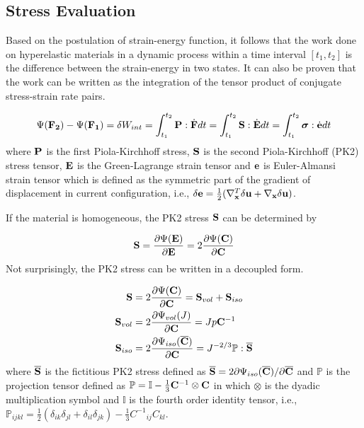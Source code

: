 %
\subsection{Stress Evaluation} \label{general_stress}
Based on the postulation of strain-energy function, it follows that the work done on hyperelastic materials in a dynamic process within a time interval $[t_1, t_2]$ is the difference between the strain-energy in two states. It can also be proven that the work can be written as the integration of the tensor product of conjugate stress-strain rate pairs.

\begin{equation}
\Psi({\bold{F_2}}) - \Psi({\bold{F_1}}) = \delta{W_{int}} = \int_{t_1}^{t_2}\bold{P}:\dot{\bold{F}}dt = \int_{t_1}^{t_2}\bold{S}:\dot{\bold{E}}dt = 
\int_{t_1}^{t_2}\boldsymbol{\sigma}:\dot{\bold{e}}dt
\end{equation}
where $\bold{P}$ is the first Piola-Kirchhoff stress, $\bold{S}$ is the second Piola-Kirchhoff (PK2) stress tensor, $\bold{E}$ is the Green-Lagrange strain tensor and $\bold{e}$ is Euler-Almansi strain tensor which is defined as the symmetric part of the gradient of displacement in current configuration, i.e., $\delta\bold{e} = \frac{1}{2}( \nabla_{\bold{x}}^T\delta\bold{u} + \nabla_{\bold{x}}\delta\bold{u} )$.

If the material is homogeneous, the PK2 stress $\bold{S}$ can be determined by 

\begin{equation}
\bold{S}  = \frac{\partial\Psi(\bold{E})}{\partial{\bold{E}}} = 2\frac{\partial\Psi(\bold{C})}{\partial{\bold{C}}}\end{equation}
Not surprisingly, the PK2 stress can be written in a decoupled form.

\begin{subequations}
\label{S}
\begin{align}
\bold{S} &=  2\frac{\partial{\Psi({\bold{C})}}}{\partial{\bold{C}}} = \bold{S}_{vol}  + \bold{S}_{iso} 
\label {Stotal} \\
\bold{S}_{vol} &= 2\frac{\partial{\Psi_{vol}(J)}}{\partial{\bold{C}}} = Jp{\bold{C}} ^{-1} \label{Svol} \\
\bold{S}_{iso}  &= 2\frac{\partial{\Psi_{iso}({\overline{\bold{C}})}}}{\partial{\bold{C}}} = J^{-2/3}\mathbb{P}:\overline{\bold{S}}
\label{Siso}
\end{align}
\end{subequations}
where  $\overline{\bold{S}}$ is the fictitious PK2 stress defined as
$\overline{\bold{S}} = 2{\partial\Psi_{iso}({\overline{\bold{C}})}} / {\partial\overline{\bold{C}}}$
and $\mathbb{P}$ is the projection tensor defined as $\mathbb{P} = \mathbb{I} - \frac{1}{3}\bold{C}^{-1} \otimes \bold{C} $ in which $\otimes$ is the dyadic multiplication symbol and $\mathbb{I}$ is the fourth order identity tensor, i.e.,  $\mathbb{P}_{ijkl} =  \frac{1}{2}(\delta_{ik}\delta_{jl} + \delta_{il}\delta_{jk}) - \frac{1}{3} {{C}^{-1}}_{ij} {C}_{kl}$.


